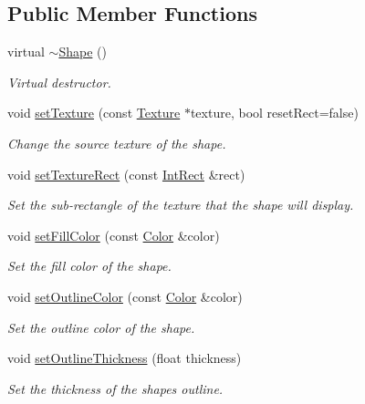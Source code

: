 \subsection*{Public Member Functions}
\begin{DoxyCompactItemize}
\item 
virtual \mbox{\hyperlink{classsf_1_1_shape_a2262aceb9df52d4275c19633592f19bf}{$\sim$\+Shape}} ()
\begin{DoxyCompactList}\small\item\em Virtual destructor. \end{DoxyCompactList}\item 
void \mbox{\hyperlink{classsf_1_1_shape_af8fb22bab1956325be5d62282711e3b6}{set\+Texture}} (const \mbox{\hyperlink{classsf_1_1_texture}{Texture}} $\ast$texture, bool reset\+Rect=false)
\begin{DoxyCompactList}\small\item\em Change the source texture of the shape. \end{DoxyCompactList}\item 
void \mbox{\hyperlink{classsf_1_1_shape_a2029cc820d1740d14ac794b82525e157}{set\+Texture\+Rect}} (const \mbox{\hyperlink{classsf_1_1_rect}{Int\+Rect}} \&rect)
\begin{DoxyCompactList}\small\item\em Set the sub-\/rectangle of the texture that the shape will display. \end{DoxyCompactList}\item 
void \mbox{\hyperlink{classsf_1_1_shape_a3506f9b5d916fec14d583d16f23c2485}{set\+Fill\+Color}} (const \mbox{\hyperlink{classsf_1_1_color}{Color}} \&color)
\begin{DoxyCompactList}\small\item\em Set the fill color of the shape. \end{DoxyCompactList}\item 
void \mbox{\hyperlink{classsf_1_1_shape_a5978f41ee349ac3c52942996dcb184f7}{set\+Outline\+Color}} (const \mbox{\hyperlink{classsf_1_1_color}{Color}} \&color)
\begin{DoxyCompactList}\small\item\em Set the outline color of the shape. \end{DoxyCompactList}\item 
void \mbox{\hyperlink{classsf_1_1_shape_a5ad336ad74fc1f567fce3b7e44cf87dc}{set\+Outline\+Thickness}} (float thickness)
\begin{DoxyCompactList}\small\item\em Set the thickness of the shape\textquotesingle{}s outline. \end{DoxyCompactList}\item 

\end{DoxyCompactItemize}
